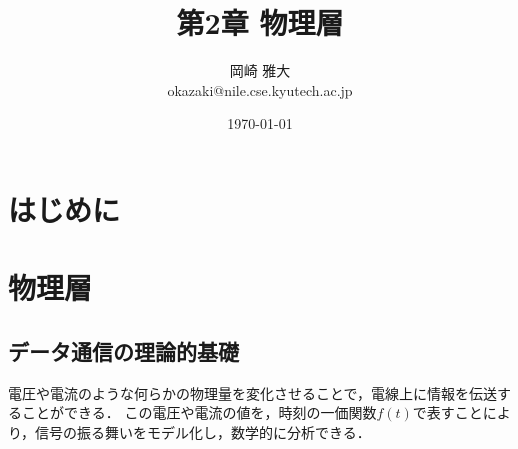 \documentclass[a4paper]{ltjsarticle}
\title{第2章 物理層}
\author{岡崎 雅大 \\ okazaki@nile.cse.kyutech.ac.jp}
\date{\today}
\begin{document}
\maketitle
\tableofcontents

\section{はじめに}

\section{物理層}
	\subsection{データ通信の理論的基礎}
		電圧や電流のような何らかの物理量を変化させることで，電線上に情報を伝送することができる．
		この電圧や電流の値を，時刻の一価関数$f(t)$で表すことにより，信号の振る舞いをモデル化し，数学的に分析できる．
\end{document}
